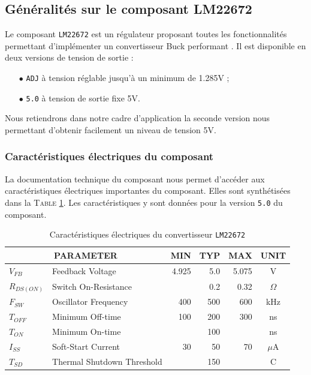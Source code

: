 		\subsection{Généralités sur le composant LM22672}
		
		Le composant \texttt{LM22672} est un régulateur proposant toutes 
		les fonctionnalités permettant d'implémenter un convertisseur 
		Buck performant \cite{LM22672}. Il est disponible en deux versions 
		de tension de sortie :
		\begin{itemize}
			\item[$\bullet$]	\texttt{ADJ} à tension réglable jusqu'à un minimum
							 	de 1.285V ;
			\item[$\bullet$]	\texttt{5.0} à tension de sortie fixe 5V.			 
		\end{itemize}
		Nous retiendrons dans notre cadre d'application la seconde version
		nous permettant d'obtenir facilement un niveau de tension 5V.
			
			\subsubsection{Caractéristiques électriques du composant}
			
			La documentation technique du composant nous permet d'accéder aux
			caractéristiques électriques importantes du composant. Elles sont
			synthétisées dans la \textsc{Table \ref{carac_elec_lm22672}}.
			Les caractéristiques y sont données pour la version \texttt{5.0}
			du composant.
			
			\begin{table}[h]
				\begin{center}
					\begin{tabular}{|l l | r r r | c|}
					\hline
					\multicolumn{2}{|c|}{\textbf{PARAMETER}}	& \textbf{MIN}	& \textbf{TYP}	
																& \textbf{MAX}	& \textbf{UNIT}\\
					\hline
					$V_{FB}$		&	Feedback Voltage		& 4.925	&	5.0	& 5.075	&	V			\\
					\hline
					$R_{DS(ON)}$ 	& 	Switch On-Resistance 	&		&	0.2	&  0.32	&	$\Omega$	\\
					\hline
					$F_{SW}$		&	Oscillator Frequency	&	400	&	500	&	600	&	kHz			\\
					\hline
					$T_{OFF}$		&	Minimum Off-time		&	100	&	200	&	300	&	ns			\\
					\hline
					$T_{ON}$		&	Minimum On-time			&		&	100	&		&	ns			\\
					\hline
					$I_{SS}$		& 	Soft-Start Current		&	30	&	50	&	70	&	$\mu$A		\\
					\hline
					$T_{SD}$		& 	Thermal Shutdown Threshold	&	&	150	&		&	\degre C	\\
					\hline
				\end{tabular}				
				\end{center}	
				\caption{Caractéristiques électriques du convertisseur \texttt{LM22672} \cite{LM22672}}
				\label{carac_elec_lm22672}
			\end{table}
			
